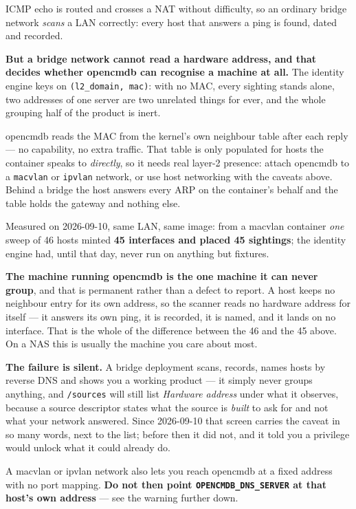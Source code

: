 \documentclass[11pt,oneside,listof=totoc,bibliography=totoc]{scrreprt}
\begin{document}
ICMP echo is routed and crosses a NAT without difficulty, so an ordinary bridge network
\emph{scans} a LAN correctly: every host that answers a ping is found, dated and recorded.

\begin{warning}
\textbf{But a bridge network cannot read a hardware address, and that decides whether opencmdb can
recognise a machine at all.} The identity engine keys on \texttt{(l2\_domain, mac)}: with no MAC,
every sighting stands alone, two addresses of one server are two unrelated things for ever, and the
whole grouping half of the product is inert.

opencmdb reads the MAC from the kernel's own neighbour table after each reply --- no capability, no
extra traffic. That table is only populated for hosts the container speaks to \emph{directly}, so
it needs real layer-2 presence: attach opencmdb to a \texttt{macvlan} or \texttt{ipvlan} network,
or use host networking with the caveats above. Behind a bridge the host answers every ARP on the
container's behalf and the table holds the gateway and nothing else.

Measured on 2026-09-10, same LAN, same image: from a macvlan container \emph{one} sweep of 46 hosts
minted \textbf{45 interfaces and placed 45 sightings}; the identity engine had, until that day,
never run on anything but fixtures.

\textbf{The machine running opencmdb is the one machine it can never group}, and that is permanent
rather than a defect to report. A host keeps no neighbour entry for its own address, so the scanner
reads no hardware address for itself --- it answers its own ping, it is recorded, it is named, and
it lands on no interface. That is the whole of the difference between the 46 and the 45 above. On a
NAS this is usually the machine you care about most.

\textbf{The failure is silent.} A bridge deployment scans, records, names hosts by reverse DNS and
shows you a working product --- it simply never groups anything, and \texttt{/sources} will still
list \emph{Hardware address} under what it observes, because a source descriptor states what the
source is \emph{built} to ask for and not what your network answered. Since 2026-09-10 that screen
carries the caveat in so many words, next to the list; before then it did not, and it told you a
privilege would unlock what it could already do.
\end{warning}

A macvlan or ipvlan network also lets you reach opencmdb at a fixed address with no port mapping.
\textbf{Do not then point \texttt{OPENCMDB\_DNS\_SERVER} at that host's own address} --- see the
warning further down.
\end{document}

